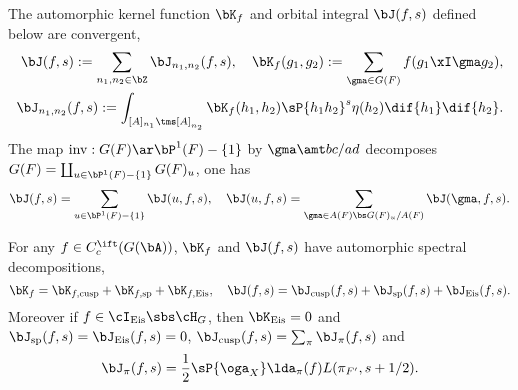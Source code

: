 \documentclass[article, a4paper, twoside]{universal}
\begin{document}
\begin{thm}
	The automorphic kernel function $\bK_{f}$ and orbital integral $\bJ(f,s)$ defined below are convergent,
	\begin{align*}
	  \bJ(f,s):=\sum_{n_{1},n_{2}\in\bZ}\bJ_{n_{1},n_{2}}(f,s),\quad \bK_{f}(g_{1},g_{2}):=\sum_{\gma\in G(F)}f(g_{1}\xI\gma g_{2}), \\ \bJ_{n_{1},n_{2}}(f,s):=\int_{[A]_{n_{1}}\tms[A]_{n_{2}}}\bK_{f}(h_{1},h_{2})\sP{h_{1}h_{2}}^{s}\eta(h_{2})\dif{h_{1}}\dif{h_{2}}.
	\end{align*}
	The map $\mathrm{inv}:G(F)\ar\bP^{1}(F)-\{1\}$ by $\gma\amt bc/ad$ decomposes $G(F)=\coprod_{u\in\bP^{1}(F)-\{1\}}G(F)_{u}$, one has
	\[
		\bJ(f,s)=\sum_{u\in\bP^{1}(F)-\{1\}}\bJ(u,f,s),\quad \bJ(u,f,s)=\sum_{\gma\in A(F)\bs G(F)_{u}/A(F)}\bJ(\gma,f,s).
	\]
\end{thm}

\begin{thm}
	For any $f\in C_{c}^{\ift}(G(\bA))$, $\bK_{f}$ and $\bJ(f,s)$ have automorphic spectral decompositions,
	\[
		\bK_{f}=\bK_{f, \mathrm{cusp}}+\bK_{f, \mathrm{sp}}+\bK_{f, \mathrm{Eis}},\quad \bJ(f,s)=\bJ_{\mathrm{cusp}}(f,s)+\bJ_{\mathrm{sp}}(f,s)+\bJ_{\mathrm{Eis}}(f,s).
	\]
	Moreover if $f\in\cI_{\mathrm{Eis}}\sbs\cH_{G}$, then $\bK_{\mathrm{Eis}}=0$ and $\bJ_{\mathrm{sp}}(f,s)=\bJ_{\mathrm{Eis}}(f,s)=0$, $\bJ_{\mathrm{cusp}}(f,s)=\sum_{\pi}\bJ_{\pi}(f,s)$ and
	\[
		\bJ_{\pi}(f,s)=\frac{1}{2}\sP{\oga_{X}}\lda_{\pi}(f)L(\pi_{F'},s+1/2).
	\]
\end{thm}


\end{document}
